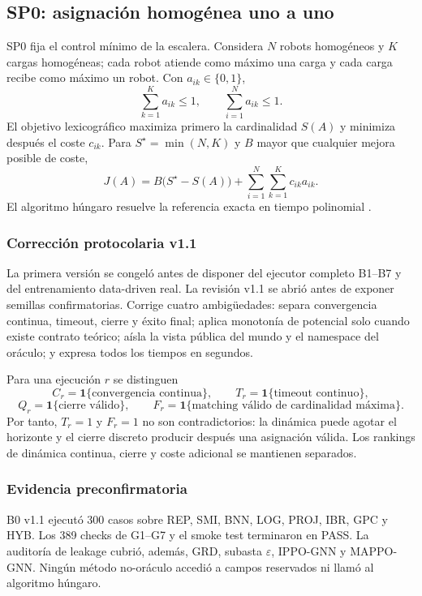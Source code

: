 \subsection{SP0: asignación homogénea uno a uno}
\label{subsec:sp0}

SP0 fija el control mínimo de la escalera. Considera $N$ robots homogéneos y $K$ cargas homogéneas; cada robot atiende como máximo una carga y cada carga recibe como máximo un robot. Con $a_{ik}\in\{0,1\}$,
\[
  \sum_{k=1}^{K} a_{ik}\leq 1,
  \qquad
  \sum_{i=1}^{N} a_{ik}\leq 1.
\]
El objetivo lexicográfico maximiza primero la cardinalidad $S(A)$ y minimiza después el coste $c_{ik}$. Para $S^\star=\min(N,K)$ y $B$ mayor que cualquier mejora posible de coste,
\[
  J(A)=B\bigl(S^\star-S(A)\bigr)+\sum_{i=1}^{N}\sum_{k=1}^{K}c_{ik}a_{ik}.
\]
El algoritmo húngaro resuelve la referencia exacta en tiempo polinomial \citep{kuhn1955hungarian}.

\subsubsection{Corrección protocolaria v1.1}

La primera versión se congeló antes de disponer del ejecutor completo B1--B7 y del entrenamiento data-driven real. La revisión v1.1 se abrió antes de exponer semillas confirmatorias. Corrige cuatro ambigüedades: separa convergencia continua, timeout, cierre y éxito final; aplica monotonía de potencial solo cuando existe contrato teórico; aísla la vista pública del mundo y el namespace del oráculo; y expresa todos los tiempos en segundos.

Para una ejecución $r$ se distinguen
\[
  C_r=\mathbf{1}\{\text{convergencia continua}\},\qquad
  T_r=\mathbf{1}\{\text{timeout continuo}\},
\]
\[
  Q_r=\mathbf{1}\{\text{cierre válido}\},\qquad
  F_r=\mathbf{1}\{\text{matching válido de cardinalidad máxima}\}.
\]
Por tanto, $T_r=1$ y $F_r=1$ no son contradictorios: la dinámica puede agotar el horizonte y el cierre discreto producir después una asignación válida. Los rankings de dinámica continua, cierre y coste adicional se mantienen separados.

\subsubsection{Evidencia preconfirmatoria}

B0 v1.1 ejecutó 300 casos sobre REP, SMI, BNN, LOG, PROJ, IBR, GPC y HYB. Los 389 checks de G1--G7 y el smoke test terminaron en PASS. La auditoría de leakage cubrió, además, GRD, subasta $\varepsilon$, IPPO-GNN y MAPPO-GNN. Ningún método no-oráculo accedió a campos reservados ni llamó al algoritmo húngaro.

